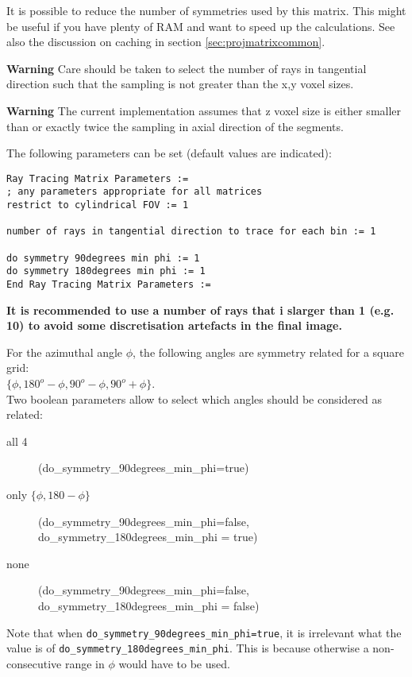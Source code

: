 \documentclass{article}
\begin{document}
It is possible to reduce the number of symmetries used by this 
matrix. This might be useful if you have plenty of RAM and want 
to speed up the calculations. See also the discussion on caching 
in section \ref{sec:projmatrixcommon}.

\textbf{Warning} Care should be taken to select the number of rays 
in tangential direction such that the sampling is not greater 
than the x,y voxel sizes.

\textbf{Warning} The current implementation assumes that z voxel size 
is either smaller than or exactly twice the sampling in axial 
direction of the segments.

{ 
}

The following parameters can be set (default values are indicated):

\begin{verbatim}
Ray Tracing Matrix Parameters := 
; any parameters appropriate for all matrices
restrict to cylindrical FOV := 1

number of rays in tangential direction to trace for each bin := 1

do symmetry 90degrees min phi := 1 
do symmetry 180degrees min phi := 1
End Ray Tracing Matrix Parameters :=
\end{verbatim}

\textbf{It is recommended to use a number of rays that i slarger than 1 (e.g. 10) to
avoid some discretisation artefacts in the final image.}

For the azimuthal angle $\phi$, the following angles are symmetry 
related for a square grid: \\
$\{\phi, 180^{o}-\phi, 90^{o}-\phi, 90^{o}+\phi\}$.\\
Two boolean parameters allow to select which angles should be 
considered as related:
\begin{description}
\item[all 4]
(do\_symmetry\_90degrees\_min\_phi=true)
\item[only $\{ \phi, 180- \phi \}$]
(do\_symmetry\_90degrees\_min\_phi=false,  \\
do\_symmetry\_180degrees\_min\_phi = true)
\item[none]
(do\_symmetry\_90degrees\_min\_phi=false, \\
do\_symmetry\_180degrees\_min\_phi = false)
\end{description}

Note that when \texttt{do\_symmetry\_90degrees\_min\_phi=true}, 
it is irrelevant what the value is 
of \texttt{do\_symmetry\_180degrees\_min\_phi}. This is because 
otherwise a non-consecutive range in $\phi$ would have to be used.
\end{document}

